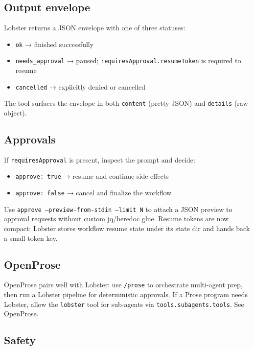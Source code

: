 \subsection{Output envelope}


Lobster returns a JSON envelope with one of three statuses:

\begin{itemize}
  \item \texttt{ok} → finished successfully
  \item \texttt{needs\_approval} → paused; \texttt{requiresApproval.resumeToken} is required to resume
  \item \texttt{cancelled} → explicitly denied or cancelled
\end{itemize}


The tool surfaces the envelope in both \texttt{content} (pretty JSON) and \texttt{details} (raw object).

\subsection{Approvals}


If \texttt{requiresApproval} is present, inspect the prompt and decide:

\begin{itemize}
  \item \texttt{approve: true} → resume and continue side effects
  \item \texttt{approve: false} → cancel and finalize the workflow
\end{itemize}


Use \texttt{approve --preview-from-stdin --limit N} to attach a JSON preview to approval requests without custom jq/heredoc glue. Resume tokens are now compact: Lobster stores workflow resume state under its state dir and hands back a small token key.

\subsection{OpenProse}


OpenProse pairs well with Lobster: use \texttt{/prose} to orchestrate multi-agent prep, then run a Lobster pipeline for deterministic approvals. If a Prose program needs Lobster, allow the \texttt{lobster} tool for sub-agents via \texttt{tools.subagents.tools}. See \href{/prose}{OpenProse}.

\subsection{Safety}


